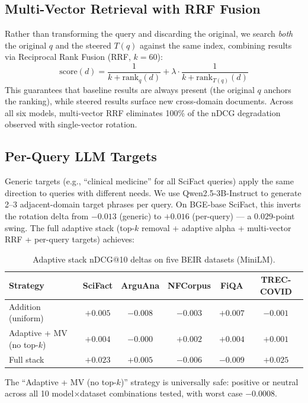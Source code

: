 \documentclass{article}
\begin{document}
\subsection{Multi-Vector Retrieval with RRF Fusion}

Rather than transforming the query and discarding the original, we search \emph{both} the original $q$ and the steered $T(q)$ against the same index, combining results via Reciprocal Rank Fusion (RRF, $k=60$):
\begin{equation}
\text{score}(d) = \frac{1}{k + \text{rank}_q(d)} + \lambda \cdot \frac{1}{k + \text{rank}_{T(q)}(d)}
\end{equation}
This guarantees that baseline results are always present (the original $q$ anchors the ranking), while steered results surface new cross-domain documents. Across all six models, multi-vector RRF eliminates 100\% of the nDCG degradation observed with single-vector rotation.

\subsection{Per-Query LLM Targets}

Generic targets (e.g., ``clinical medicine'' for all SciFact queries) apply the same direction to queries with different needs. We use Qwen2.5-3B-Instruct to generate 2--3 adjacent-domain target phrases per query. On BGE-base SciFact, this inverts the rotation delta from $-0.013$ (generic) to $+0.016$ (per-query) --- a $0.029$-point swing. The full adaptive stack (top-$k$ removal + adaptive alpha + multi-vector RRF + per-query targets) achieves:

\begin{table}[h]
\centering
\caption{Adaptive stack nDCG@10 deltas on five BEIR datasets (MiniLM).}
\begin{tabular}{lccccc}
\toprule
Strategy & SciFact & ArguAna & NFCorpus & FiQA & TREC-COVID \\
\midrule
Addition (uniform) & $+0.005$ & $-0.008$ & $-0.003$ & $+0.007$ & $-0.001$ \\
Adaptive + MV (no top-$k$) & $+0.004$ & $-0.000$ & $+0.002$ & $+0.004$ & $+0.001$ \\
Full stack & $\mathbf{+0.023}$ & $+0.005$ & $-0.006$ & $-0.009$ & $\mathbf{+0.025}$ \\
\bottomrule
\end{tabular}
\end{table}

The ``Adaptive + MV (no top-$k$)'' strategy is universally safe: positive or neutral across all 10 model$\times$dataset combinations tested, with worst case $-0.0008$.
\end{document}

